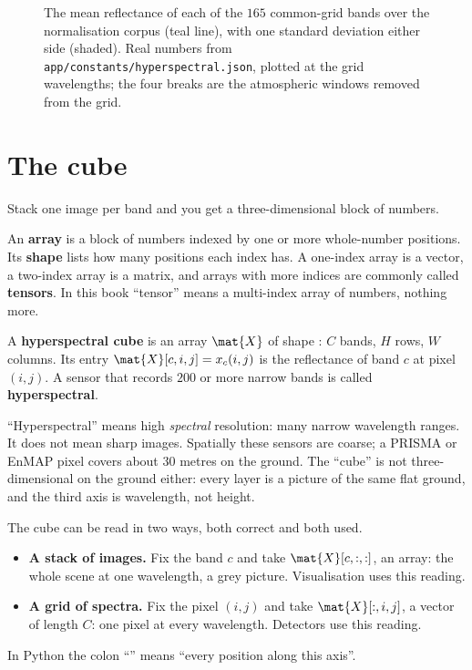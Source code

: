 \begin{figure}[htbp]
\caption{The mean reflectance of each of the $165$ common-grid bands over the normalisation corpus
(teal line), with one standard deviation either side (shaded). Real numbers from
\texttt{app/constants/hyperspectral.json}, plotted at the grid wavelengths; the four breaks are
the atmospheric windows removed from the grid.}\label{fig:light:meanspec}
\end{figure}

\section{The cube}\label{sec:light:cube}

Stack one image per band and you get a three-dimensional block of numbers.

\begin{definition}
An \textbf{array} is a block of numbers indexed by one or more whole-number positions. Its
\textbf{shape} lists how many positions each index has. A one-index array is a vector, a
two-index array is a matrix, and arrays with more indices are commonly called
\textbf{tensors}. In this book ``tensor'' means a multi-index array of numbers, nothing more.
\end{definition}

\begin{definition}
A \textbf{hyperspectral cube} is an array $\mat{X}$ of shape : $C$ bands,
$H$ rows, $W$ columns. Its entry $\mat{X}[c, i, j] = x_c(i,j)$ is the reflectance of band $c$ at
pixel $(i,j)$. A sensor that records $200$ or more narrow bands is called
\textbf{hyperspectral}.
\end{definition}

``Hyperspectral'' means high \emph{spectral} resolution: many narrow wavelength ranges. It does
not mean sharp images. Spatially these sensors are coarse; a PRISMA or EnMAP pixel covers about
$30$ metres on the ground. The ``cube'' is not three-dimensional on the ground either: every
layer is a picture of the same flat ground, and the third axis is wavelength, not height.

The cube can be read in two ways, both correct and both used.
\begin{itemize}
\item \textbf{A stack of images.} Fix the band $c$ and take $\mat{X}[c, :, :]$, an
 array: the whole scene at one wavelength, a grey picture. Visualisation uses this
reading.
\item \textbf{A grid of spectra.} Fix the pixel $(i,j)$ and take $\mat{X}[:, i, j]$, a vector of
length $C$: one pixel at every wavelength. Detectors use this reading.
\end{itemize}
In Python the colon ``\code{:}'' means ``every position along this axis''.

